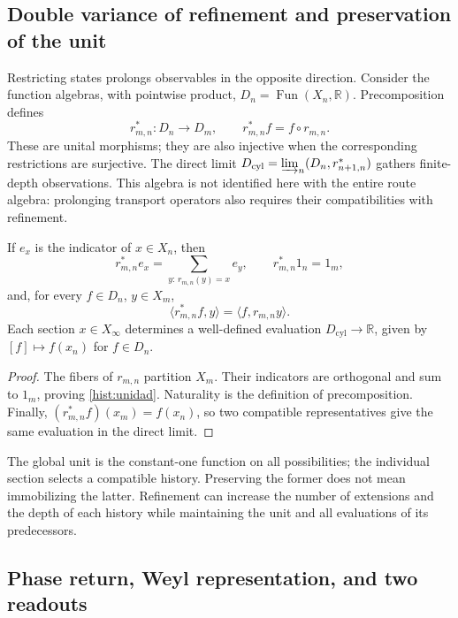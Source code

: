 \subsection{Double variance of refinement and preservation of the unit}
\label{hist:doble-varianza}

Restricting states prolongs observables in the opposite direction.
Consider the function algebras, with pointwise product,
\(D_n=\operatorname{Fun}(X_n,\mathbb R)\). Precomposition defines
\begin{equation}
 r_{m,n}^*:D_n\longrightarrow D_m,
 \qquad r_{m,n}^*f=f\circ r_{m,n}.
 \label{hist:precomposicion}
\end{equation}
These are unital morphisms; they are also injective when the corresponding
restrictions are surjective. The direct limit
\(D_{\mathrm{cyl}}=\varinjlim_n(D_n,r_{n+1,n}^*)\) gathers
finite-depth observations. This algebra is not identified here
with the entire route algebra: prolonging transport operators also requires
their compatibilities with refinement.

\begin{lemma}
If \(e_x\) is the indicator of \(x\in X_n\), then
\begin{equation}
 r_{m,n}^*e_x=\sum_{y:\,r_{m,n}(y)=x}e_y,
 \qquad r_{m,n}^*1_n=1_m,
 \label{hist:unidad}
\end{equation}
and, for every \(f\in D_n\), \(y\in X_m\),
\[
 \langle r_{m,n}^*f,y\rangle=\langle f,r_{m,n}y\rangle.
\]
Each section \(x\in X_\infty\) determines a well-defined evaluation
\(D_{\mathrm{cyl}}\to\mathbb R\), given by \([f]\mapsto f(x_n)\)
for \(f\in D_n\).
\end{lemma}
\begin{proof}
The fibers of \(r_{m,n}\) partition \(X_m\). Their
indicators are orthogonal and sum to \(1_m\), proving
\eqref{hist:unidad}. Naturality is the definition of precomposition.
Finally, \((r_{m,n}^*f)(x_m)=f(x_n)\), so two compatible
representatives give the same evaluation in the direct limit.
\end{proof}

The global unit is the constant-one function on all possibilities;
the individual section selects a compatible history. Preserving the
former does not mean immobilizing the latter. Refinement can increase
the number of extensions and the depth of each history while maintaining
the unit and all evaluations of its predecessors.

\subsection{Phase return, Weyl representation, and two readouts}
\label{hist:puente-lecturas}

